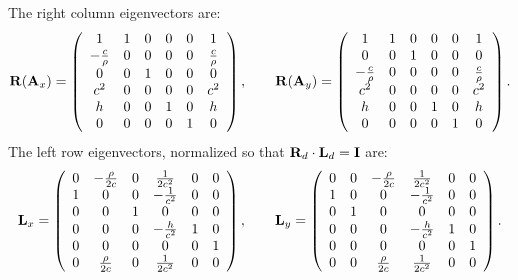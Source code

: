 The right column eigenvectors are:
\begin{equation}
{\bf R}({\bf A}_x) =
\left(\begin{array}{cccccc}
1 & 1 & 0 & 0 & 0 & 1 \\
-\frac{c}{\rho} & 0 & 0 & 0 & 0 & \frac{c}{\rho} \\
0 & 0 & 1 & 0 & 0 & 0 \\
c^2 & 0 & 0 & 0 & 0 & c^2 \\
h & 0 & 0 & 1 & 0 & h \\
0 & 0 & 0 & 0 & 1 & 0 \\
\end{array}\right),
\qquad
{\bf R}({\bf A}_y) =
\left(\begin{array}{cccccc}
1 & 1 & 0 & 0 & 0 & 1 \\
0 & 0 & 1 & 0 & 0 & 0 \\
-\frac{c}{\rho} & 0 & 0 & 0 & 0 & \frac{c}{\rho} \\
c^2 & 0 & 0 & 0 & 0 & c^2 \\
h & 0 & 0 & 1 & 0 & h \\
0 & 0 & 0 & 0 & 1 & 0 \\
\end{array}\right).
\end{equation}
The left row eigenvectors, normalized so that ${\bf R}_d\cdot{\bf L}_d = {\bf I}$ are:
\begin{equation}
{\bf L}_x =
\left(\begin{array}{cccccc}
0 & -\frac{\rho}{2c} & 0 & \frac{1}{2c^2} & 0 & 0 \\
1 & 0 & 0 & -\frac{1}{c^2} & 0 & 0 \\
0 & 0 & 1 & 0 & 0 & 0 \\
0 & 0 & 0 & -\frac{h}{c^2} & 1 & 0 \\
0 & 0 & 0 & 0 & 0 & 1 \\
0 & \frac{\rho}{2c} & 0 & \frac{1}{2c^2} & 0 & 0
\end{array}\right),
\qquad
{\bf L}_y =
\left(\begin{array}{cccccc}
0 & 0 & -\frac{\rho}{2c} & \frac{1}{2c^2} & 0 & 0 \\
1 & 0 & 0 & -\frac{1}{c^2} & 0 & 0 \\
0 & 1 & 0 & 0 & 0 & 0 \\
0 & 0 & 0 & -\frac{h}{c^2} & 1 & 0 \\
0 & 0 & 0 & 0 & 0 & 1 \\
0 & 0 & \frac{\rho}{2c} & \frac{1}{2c^2} & 0 & 0
\end{array}\right).
\end{equation}

